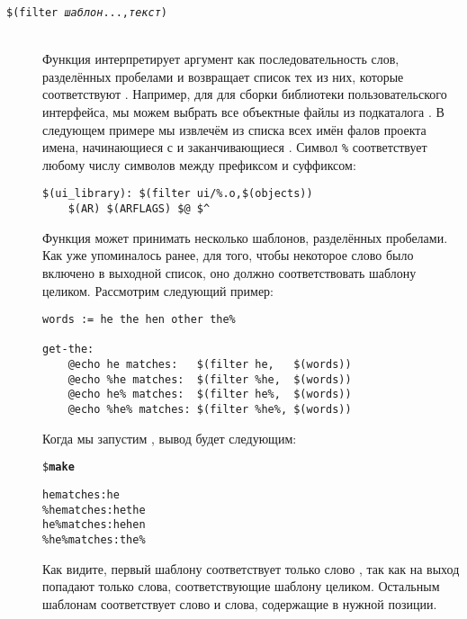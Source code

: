 \begin{description}
\item[\texttt{\$(filter \emph{шаблон}...,\emph{текст})}] \hfill \\
Функция  интерпретирует аргумент 
как последовательность слов, разделённых пробелами и возвращает список
тех из них, которые соответствуют . Например, для
для сборки библиотеки пользовательского интерфейса, мы можем выбрать
все объектные файлы из подкаталога . В следующем примере
мы извлечём из списка всех имён фалов проекта имена, начинающиеся с
 и заканчивающиеся . Символ \texttt{\%{}}
соответствует любому числу символов между префиксом и суффиксом:

{\footnotesize
\begin{verbatim}
$(ui_library): $(filter ui/%.o,$(objects))
    $(AR) $(ARFLAGS) $@ $^
\end{verbatim}
}

Функция  может принимать несколько шаблонов,
разделённых пробелами. Как уже упоминалось ранее, для того, чтобы
некоторое слово было включено в выходной список, оно должно
соответствовать шаблону целиком. Рассмотрим следующий пример:

{\footnotesize
\begin{verbatim}
words := he the hen other the%

get-the:
    @echo he matches:   $(filter he,   $(words))
    @echo %he matches:  $(filter %he,  $(words))
    @echo he% matches:  $(filter he%,  $(words))
    @echo %he% matches: $(filter %he%, $(words))
\end{verbatim}
}

Когда мы запустим \GNUmake{}, вывод будет следующим:

{\footnotesize
\begin{alltt}
\$ \textbf{make}

he matches: he
\%he matches: he the
he\% matches: he hen
\%he\% matches: the\%
\end{alltt}
}

Как видите, первый шаблону соответствует только слово ,
так как на выход  попадают только слова,
соответствующие шаблону целиком. Остальным шаблонам соответствует
слово  и слова, содержащие  в нужной позиции.


\end{description}
